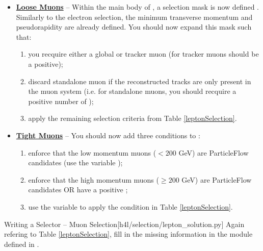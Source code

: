 \begin{itemize}
    \item {
        \textbf{\underline{Loose Muons}} -- Within the main body of , a selection mask is now defined .
        Similarly to the electron selection, the minimum transverse momentum and pseudorapidity are already defined.
        You should now expand this mask such that:
        \begin{enumerate}
            \item you recquire either a global or tracker muon (for tracker muons  should be a positive);
            \item discard standalone muon if the reconstructed tracks are only present in the muon system (i.e. for standalone muons, you should recquire a positive number of );
            \item apply the remaining selection criteria from Table \ref{leptonSelection}.
        \end{enumerate}
    }
    \item {
        \textbf{\underline{Tight Muons}} -- You should now add three conditions to :
        \begin{enumerate}
            \item enforce that the low momentum muons ($< 200$ GeV) are ParticleFlow candidates (use the variable );
            \item enforce that the high momentum muons ($\geq 200$ GeV) are ParticleFlow candidates OR have a positive ;
            \item use the variable  to apply the condition in Table \ref{leptonSelection}.
        \end{enumerate}
    }
\end{itemize}

\begin{exercise}{Writing a Selector -- Muon Selection}[h4l/selection/lepton\_solution.py]
	Again refering to Table \ref{leptonSelection}, fill in the missing information in the  module  defined in .
\end{exercise}
